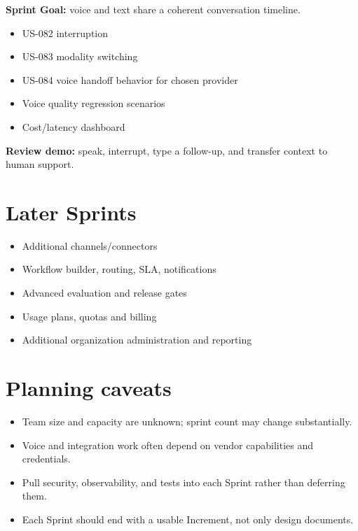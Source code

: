 \textbf{Sprint Goal:} voice and text share a coherent conversation timeline.

\begin{itemize}
\item US-082 interruption
\item US-083 modality switching
\item US-084 voice handoff behavior for chosen provider
\item Voice quality regression scenarios
\item Cost/latency dashboard
\end{itemize}
\textbf{Review demo:} speak, interrupt, type a follow-up, and transfer context to human support.



\section{Later Sprints}

\begin{itemize}
\item Additional channels/connectors
\item Workflow builder, routing, SLA, notifications
\item Advanced evaluation and release gates
\item Usage plans, quotas and billing
\item Additional organization administration and reporting
\end{itemize}
\section{Planning caveats}

\begin{itemize}
\item Team size and capacity are unknown; sprint count may change substantially.
\item Voice and integration work often depend on vendor capabilities and credentials.
\item Pull security, observability, and tests into each Sprint rather than deferring them.
\item Each Sprint should end with a usable Increment, not only design documents.
\end{itemize}




